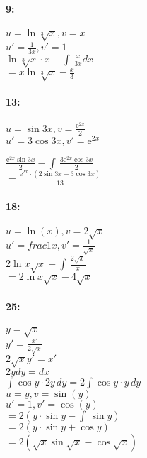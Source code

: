 \documentclass[12pt]{article}
\newcommand{\me}{\mathrm{e}}
\begin{document}
    \paragraph{9:\\}
    $u = \ln{\sqrt[3]{x}}, v = x$\\
    $u' = \frac{1}{3x}, v' = 1$ \\
    $\ln{\sqrt[3]{x}} \cdot x - \int \, \frac{x}{3x} \! dx$\\
    $=x\ln{\sqrt[3]{x}} - \frac{x}{3}$\\

    \paragraph*{13:\\}
    $u = \sin{3x}, v = \frac{\me^{2x}}{2}$\\
    $u' = 3\cos{3x}, v' = \me^{2x}$

    $\frac{\me^{2x} \sin{3x}}{2} - \int \, \frac{3\me^{2x}\cos{3x}}{2}$\\
    $= \frac{\me^{2x} \cdot (2\sin{3x}-3\cos{3x})}{13}$\\

    \paragraph*{18:\\}
    $u = \ln(x), v = 2\sqrt{x}$\\
    $u' = frac{1}{x}, v' = \frac{1}{\sqrt{x}}$\\
    $2\ln{x}\sqrt{x} - \int \, \frac{2\sqrt{x}}{x}$\\
    $=2\ln{x}\sqrt{x} - 4\sqrt{x}$\\

    \paragraph*{25:\\}
    $y = \sqrt{x}$\\
    $y' = \frac{x'}{2\sqrt{x}}$\\
    $2\sqrt{x} y' = x'$\\
    $2y \! dy = dx$\\

    $\int \! \cos{y} \cdot 2y \, dy = 2 \int \! \cos{y} \cdot y \, dy$\\
    $u = y, v = \sin(y)$\\
    $u' = 1, v' = \cos(y)$\\
    $= 2(y\cdot\sin{y} - \int \, \sin{y})$\\
    $= 2(y\cdot\sin{y} + \cos{y})$\\
    $= 2(\sqrt{x}\sin{\sqrt{x}} - \cos{\sqrt{x}})$\\
\end{document}
